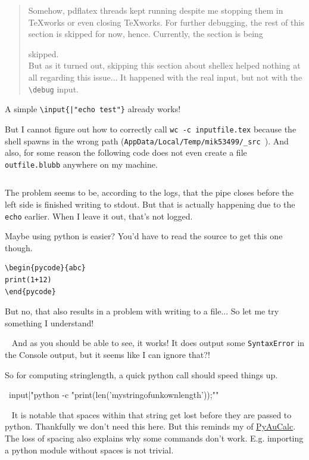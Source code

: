 \documentclass{article} \usepackage[utf8]{inputenc}
\makeatletter
\newenvironment{pycode}[1]%
{\xdef\d@tn@me{#1}\xdef\r@ncmd{python #1.py > #1.plog}%
\typeout{Writing file #1}\VerbatimOut{#1.py}%
}
{\endVerbatimOut %
\toks0{\immediate\write18}%
\expandafter\toks\expandafter1\expandafter{\r@ncmd}%
 \edef\d@r@ncmd{\the\toks0{\the\toks1}}\d@r@ncmd %
 \noindent Input
 \inputminted{python}{\d@tn@me.py}%
 \noindent Output
 \inputminted{text}{\d@tn@me.plog}%
 }
\newcommand{\code}[1]{\colorbox{codebggray}{{\texttt{#1}}}}
\newif\ifrunshellex
\makeatother
\begin{document}
\begin{quote}
Somehow, pdflatex threads kept running despite me stopping them in TeXworks or even closing TeXworks. For further debugging, the rest of this section is skipped for now, hence. Currently, the section is being
\ifrunshellex
run.\\
\else
skipped.\\
\fi
But as it turned out, skipping this section about shellex helped nothing at all regarding this issue... It happened with the real input, but not with the \code{\textbackslash debug} input.
\end{quote}
\ifrunshellex %

A simple \texttt{\textbackslash input\{|"echo test"\}} already works!


But I cannot figure out how to correctly call \texttt{wc -c inputfile.tex} because the shell spawns in the wrong path (\code{AppData/Local/Temp/mik53499/\_src }). And also, for some reason the following code does not even create a file \texttt{outfile.blubb} anywhere on my machine.
\begin{lstlisting}

\end{lstlisting}
The problem seems to be, according to the logs, that the pipe closes before the left side is finished writing to stdout. But that is actually happening due to the \texttt{echo} earlier. When I leave it out, that's not logged.

Maybe using python is easier? You'd have to read the source to get this one though.
\begin{lstlisting}
\begin{pycode}{abc}
print(1+12)
\end{pycode}
\end{lstlisting}
But no, that also results in a problem with writing to a file... So let me try something I understand!
\begin{mycode}

\end{mycode}

~\newline
And as you should be able to see, it works!
It does output some \code{SyntaxError} in the Console output, but it seems like I can ignore that?!

So for computing stringlength, a quick python call should speed things up.
\begin{mycode}
\ input{|"python -c "print(len('mystringofunkownlength'));""}
\end{mycode}

~\newline
It is notable that spaces within that string get lost before they are passed to python. Thankfully we don't need this here. But this reminds my of \href{https://ctftime.org/writeup/21982}{PyAuCalc}.
The loss of spacing also explains why some commands don't work. E.g. importing a python module without spaces is not trivial.
\end{document}
